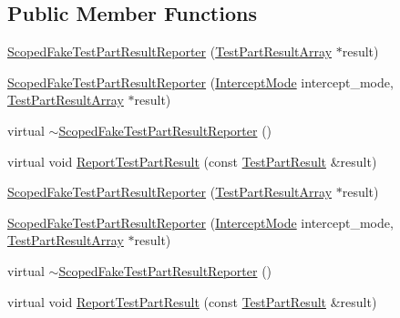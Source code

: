 \subsection*{\-Public \-Member \-Functions}
\begin{DoxyCompactItemize}
\item 
\hyperlink{classtesting_1_1ScopedFakeTestPartResultReporter_af5c28bc39bc95da0223fc3f926419aa2}{\-Scoped\-Fake\-Test\-Part\-Result\-Reporter} (\hyperlink{classtesting_1_1TestPartResultArray}{\-Test\-Part\-Result\-Array} $\ast$result)
\item 
\hyperlink{classtesting_1_1ScopedFakeTestPartResultReporter_a4a52e5646a88216e62c6c61874b06930}{\-Scoped\-Fake\-Test\-Part\-Result\-Reporter} (\hyperlink{classtesting_1_1ScopedFakeTestPartResultReporter_a1d75549697022f869ab9d184916077d2}{\-Intercept\-Mode} intercept\-\_\-mode, \hyperlink{classtesting_1_1TestPartResultArray}{\-Test\-Part\-Result\-Array} $\ast$result)
\item 
virtual \hyperlink{classtesting_1_1ScopedFakeTestPartResultReporter_ad424dbca5099cec78b6aa2ca4c3aac75}{$\sim$\-Scoped\-Fake\-Test\-Part\-Result\-Reporter} ()
\item 
virtual void \hyperlink{classtesting_1_1ScopedFakeTestPartResultReporter_acd54d55b39f168c91b6370be62cef448}{\-Report\-Test\-Part\-Result} (const \hyperlink{classtesting_1_1TestPartResult}{\-Test\-Part\-Result} \&result)
\item 
\hyperlink{classtesting_1_1ScopedFakeTestPartResultReporter_af5c28bc39bc95da0223fc3f926419aa2}{\-Scoped\-Fake\-Test\-Part\-Result\-Reporter} (\hyperlink{classtesting_1_1TestPartResultArray}{\-Test\-Part\-Result\-Array} $\ast$result)
\item 
\hyperlink{classtesting_1_1ScopedFakeTestPartResultReporter_a4a52e5646a88216e62c6c61874b06930}{\-Scoped\-Fake\-Test\-Part\-Result\-Reporter} (\hyperlink{classtesting_1_1ScopedFakeTestPartResultReporter_a1d75549697022f869ab9d184916077d2}{\-Intercept\-Mode} intercept\-\_\-mode, \hyperlink{classtesting_1_1TestPartResultArray}{\-Test\-Part\-Result\-Array} $\ast$result)
\item 
virtual \hyperlink{classtesting_1_1ScopedFakeTestPartResultReporter_acf21d6d484fa9f31b58a1a22a49f22e1}{$\sim$\-Scoped\-Fake\-Test\-Part\-Result\-Reporter} ()
\item 
virtual void \hyperlink{classtesting_1_1ScopedFakeTestPartResultReporter_a8662b990bc0a42bbe9fba3cded22d79e}{\-Report\-Test\-Part\-Result} (const \hyperlink{classtesting_1_1TestPartResult}{\-Test\-Part\-Result} \&result)
\end{DoxyCompactItemize}
